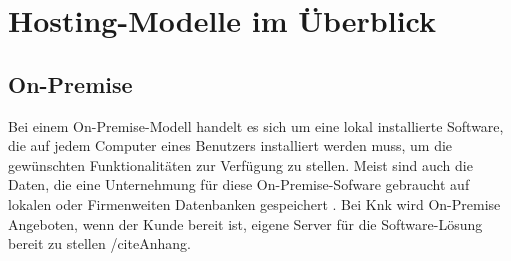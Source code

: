 \documentclass[12pt,bibtotoc]{article}
\begin{document}
	\section{Hosting-Modelle im Überblick}
		\subsection{On-Premise}
		Bei einem On-Premise-Modell handelt es sich um eine lokal installierte Software, die auf jedem Computer eines Benutzers installiert werden muss, um die gewünschten Funktionalitäten zur Verfügung zu stellen.
		Meist sind auch die Daten, die eine Unternehmung für diese On-Premise-Sofware gebraucht auf lokalen oder Firmenweiten Datenbanken gespeichert \cite{AlHayek.2020}. 
		Bei Knk wird On-Premise Angeboten, wenn der Kunde bereit ist, eigene Server für die Software-Lösung bereit zu stellen /cite{Anhang}.
\end{document}
